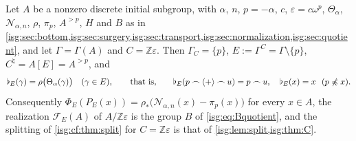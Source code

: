 \documentclass[11pt]{article}
\theoremstyle{definition}
\theoremstyle{remark}
\newcommand{\Z}{\mathbb{Z}}
\newcommand{\cat}{\mathbin{\frown}}
\newcommand{\plus}{\langle+\rangle}
\newcommand{\pre}{\mathrel{\preccurlyeq}}
\newcommand{\Rect}{\mathcal{N}_{\alpha,n}}
\newcommand{\tht}{\Theta_{\alpha}}
\newcommand{\cmp}[1]{\flat_{#1}}
\begin{document}
\begin{proposition}\label{isg:cf:prop:cyclic}
Let $A$ be a nonzero discrete initial subgroup, with $\alpha$, $n$,
$p=-\alpha$, $c$, $\varepsilon=c\omega^p$, $\tht$, $\Rect$, $\rho$,
$\pi_p$, $A^{>p}$, $H$ and $B$ as in
\cref{isg:sec:bottom,isg:sec:surgery,isg:sec:transport,isg:sec:normalization,isg:sec:quotient},
and let $\Gamma=\Gamma(A)$ and $C=\Z\varepsilon$. Then
$\Gamma_C=\{p\}$, $E:=\Gamma^C=\Gamma\setminus\{p\}$,
$C^\natural=A[E]=A^{>p}$, and
\begin{equation}\label{isg:cf:eq:cyclic}
 \cmp E(\gamma)=\rho\bigl(\tht(\gamma)\bigr)\quad(\gamma\in E),
 \qquad\text{that is,}\qquad
 \cmp E(p\cat\plus\cat u)=p\cat u,\quad
 \cmp E(x)=x\ \ (p\not\pre x).
\end{equation}
Consequently $\Phi_E(P_E(x))=\rho_*\bigl(\Rect(x)-\pi_p(x)\bigr)$ for every
$x\in A$, the realization $\mathcal F_E(A)$ of $A/\Z\varepsilon$ is the
group $B$ of \eqref{isg:eq:Bquotient}, and the splitting of
\cref{isg:cf:thm:split} for $C=\Z\varepsilon$ is that of
\cref{isg:lem:split,isg:thm:C}.
\end{proposition}
\end{document}
